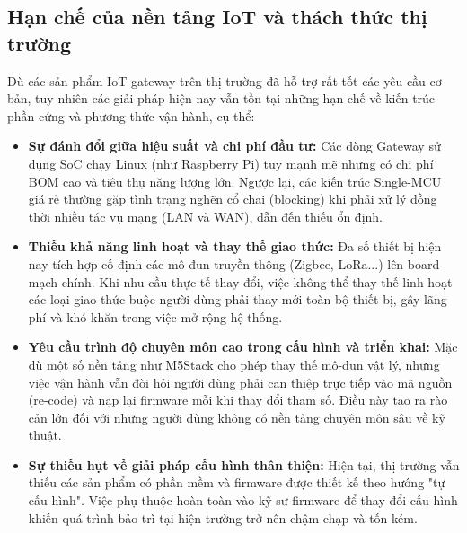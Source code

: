     \subsection{Hạn chế của nền tảng IoT và thách thức thị trường}\label{sec:han_che_iot}
        Dù các sản phẩm IoT gateway trên thị trường đã hỗ trợ rất tốt các yêu cầu cơ bản, tuy nhiên các giải pháp hiện nay vẫn tồn tại những hạn chế về kiến trúc phần cứng và phương thức vận hành, cụ thể:
        \begin{itemize}
            \item \textbf{Sự đánh đổi giữa hiệu suất và chi phí đầu tư:} Các dòng Gateway sử dụng SoC chạy Linux (như Raspberry Pi) tuy mạnh mẽ nhưng có chi phí BOM cao và tiêu thụ năng lượng lớn. Ngược lại, các kiến trúc Single-MCU giá rẻ thường gặp tình trạng nghẽn cổ chai (blocking) khi phải xử lý đồng thời nhiều tác vụ mạng (LAN và WAN), dẫn đến thiếu ổn định.
            \item \textbf{Thiếu khả năng linh hoạt và thay thế giao thức:} Đa số thiết bị hiện nay tích hợp cố định các mô-đun truyền thông (Zigbee, LoRa...) lên board mạch chính. Khi nhu cầu thực tế thay đổi, việc không thể thay thế linh hoạt các loại giao thức buộc người dùng phải thay mới toàn bộ thiết bị, gây lãng phí và khó khăn trong việc mở rộng hệ thống.
            \item \textbf{Yêu cầu trình độ chuyên môn cao trong cấu hình và triển khai:} Mặc dù một số nền tảng như M5Stack cho phép thay thế mô-đun vật lý, nhưng việc vận hành vẫn đòi hỏi người dùng phải can thiệp trực tiếp vào mã nguồn (re-code) và nạp lại firmware mỗi khi thay đổi tham số. Điều này tạo ra rào cản lớn đối với những người dùng không có nền tảng chuyên môn sâu về kỹ thuật.
            \item \textbf{Sự thiếu hụt về giải pháp cấu hình thân thiện:} Hiện tại, thị trường vẫn thiếu các sản phẩm có phần mềm và firmware được thiết kế theo hướng "tự cấu hình". Việc phụ thuộc hoàn toàn vào kỹ sư firmware để thay đổi cấu hình khiến quá trình bảo trì tại hiện trường trở nên chậm chạp và tốn kém.
        \end{itemize}

